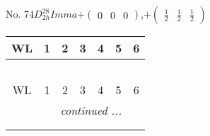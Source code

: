 \documentclass[fleqn,9pt,landscape]{jsarticle}
\begin{document}
\newpage
No. 74\quad$D_{2h}^{28}$\quad$Imma$\quad[ orthorhombic ]\quad$+\begin{pmatrix} 0 & 0 & 0 \end{pmatrix}$,\quad $+\begin{pmatrix} \frac{1}{2} & \frac{1}{2} & \frac{1}{2} \end{pmatrix}$
\begin{center}
\renewcommand{\arraystretch}{1.2}
\begin{longtable}{ccccccc}
 \hline \hline
WL & 1 & 2 & 3 & 4 & 5 & 6 \\ \hline \endfirsthead

\multicolumn{6}{l}{\tablename\ \thetable{}} \\
 \hline \hline
WL & 1 & 2 & 3 & 4 & 5 & 6 \\ \hline \endhead

 \hline \hline
\multicolumn{6}{r}{\footnotesize\it continued ...} \\ \endfoot

 \hline \hline
\multicolumn{6}{r}{} \\ \endlastfoot


\end{longtable}
\end{center}
\end{document}
